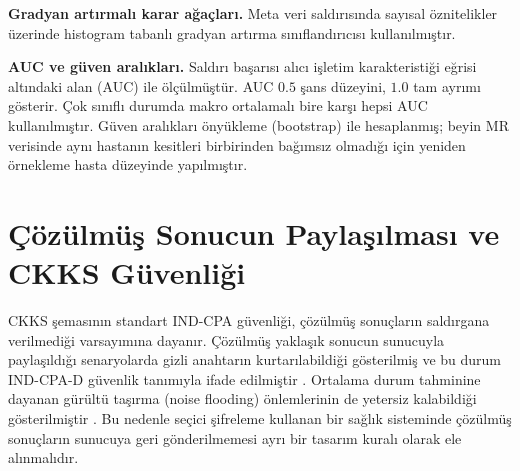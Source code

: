 \textbf{Gradyan artırmalı karar ağaçları.} Meta veri saldırısında sayısal öznitelikler üzerinde histogram tabanlı gradyan artırma sınıflandırıcısı kullanılmıştır.

\textbf{AUC ve güven aralıkları.} Saldırı başarısı alıcı işletim karakteristiği eğrisi altındaki alan (AUC) ile ölçülmüştür. AUC $0.5$ şans düzeyini, $1.0$ tam ayrımı gösterir. Çok sınıflı durumda makro ortalamalı bire karşı hepsi AUC kullanılmıştır. Güven aralıkları önyükleme (bootstrap) ile hesaplanmış; beyin MR verisinde aynı hastanın kesitleri birbirinden bağımsız olmadığı için yeniden örnekleme hasta düzeyinde yapılmıştır.

\section{Çözülmüş Sonucun Paylaşılması ve CKKS Güvenliği}\label{sec:indcpad}

CKKS şemasının standart IND-CPA güvenliği, çözülmüş sonuçların saldırgana verilmediği varsayımına dayanır. Çözülmüş yaklaşık sonucun sunucuyla paylaşıldığı senaryolarda gizli anahtarın kurtarılabildiği gösterilmiş ve bu durum IND-CPA-D güvenlik tanımıyla ifade edilmiştir \cite{limicciancio2021}. Ortalama durum tahminine dayanan gürültü taşırma (noise flooding) önlemlerinin de yetersiz kalabildiği gösterilmiştir \cite{guo2024keyrecovery}. Bu nedenle seçici şifreleme kullanan bir sağlık sisteminde çözülmüş sonuçların sunucuya geri gönderilmemesi ayrı bir tasarım kuralı olarak ele alınmalıdır.
